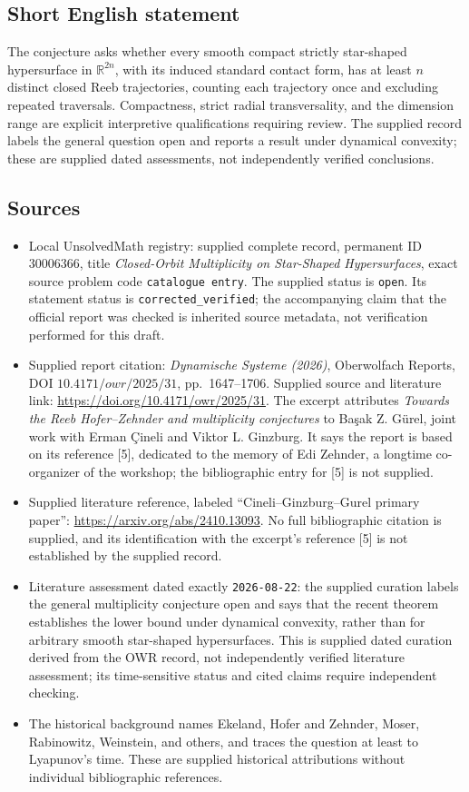 \documentclass[11pt]{article}
\newcommand{\R}{\mathbb{R}}
\begin{document}
\subsection{Short English statement}
The conjecture asks whether every smooth compact strictly star-shaped hypersurface in \(\R^{2n}\), with its induced standard contact form, has at least \(n\) distinct closed Reeb trajectories, counting each trajectory once and excluding repeated traversals. Compactness, strict radial transversality, and the dimension range are explicit interpretive qualifications requiring review. The supplied record labels the general question open and reports a result under dynamical convexity; these are supplied dated assessments, not independently verified conclusions.
\subsection{Sources}
\begin{itemize}
\item Local UnsolvedMath registry: supplied complete record, permanent ID \(30006366\), title \emph{Closed-Orbit Multiplicity on Star-Shaped Hypersurfaces}, exact source problem code \texttt{catalogue entry}. The supplied status is \texttt{open}. Its statement status is \texttt{corrected\_verified}; the accompanying claim that the official report was checked is inherited source metadata, not verification performed for this draft.
\item Supplied report citation: \emph{Dynamische Systeme (2026)}, Oberwolfach Reports, DOI \(10.4171/owr/2025/31\), pp.\ 1647--1706. Supplied source and literature link: \url{https://doi.org/10.4171/owr/2025/31}. The excerpt attributes \emph{Towards the Reeb Hofer--Zehnder and multiplicity conjectures} to Başak Z. Gürel, joint work with Erman Çineli and Viktor L. Ginzburg. It says the report is based on its reference [5], dedicated to the memory of Edi Zehnder, a longtime co-organizer of the workshop; the bibliographic entry for [5] is not supplied.
\item Supplied literature reference, labeled ``Cineli--Ginzburg--Gurel primary paper'': \url{https://arxiv.org/abs/2410.13093}. No full bibliographic citation is supplied, and its identification with the excerpt's reference [5] is not established by the supplied record.
\item Literature assessment dated exactly \texttt{2026-08-22}: the supplied curation labels the general multiplicity conjecture open and says that the recent theorem establishes the lower bound under dynamical convexity, rather than for arbitrary smooth star-shaped hypersurfaces. This is supplied dated curation derived from the OWR record, not independently verified literature assessment; its time-sensitive status and cited claims require independent checking.
\item The historical background names Ekeland, Hofer and Zehnder, Moser, Rabinowitz, Weinstein, and others, and traces the question at least to Lyapunov's time. These are supplied historical attributions without individual bibliographic references.
\end{itemize}
\end{document}
